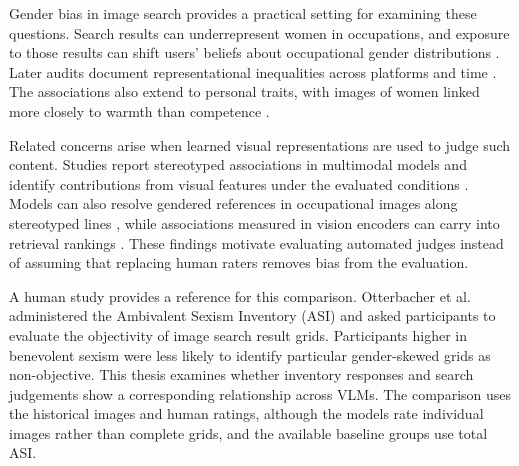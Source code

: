 Gender bias in image search provides a practical setting for examining these
questions. Search results can underrepresent women in occupations, and exposure
to those results can shift users' beliefs about occupational gender distributions
\cite{kay2015unequal}. Later audits document representational inequalities
across platforms and time \cite{metaxa2021image}. The associations also extend
to personal traits, with images of women linked more closely to warmth than
competence \cite{otterbacher2017competent}.

Related concerns arise when learned visual representations are used to judge
such content. Studies report stereotyped associations in multimodal models and
identify contributions from visual features under the evaluated conditions
\cite{jiang2024modscan,weng2024images}. Models can also resolve gendered
references in occupational images along stereotyped lines
\cite{hall2023visogender}, while associations measured in vision encoders can
carry into retrieval rankings \cite{ghate2025biases}. These findings motivate
evaluating automated judges instead of assuming that replacing human raters
removes bias from the evaluation.

A human study provides a reference for this comparison. Otterbacher et al.\
\cite{otterbacher2018sigir} administered the Ambivalent Sexism Inventory
(ASI) \cite{glick1996asi} and asked participants to evaluate the objectivity
of image search result grids. Participants higher in benevolent sexism were
less likely to identify particular gender-skewed grids as non-objective.
This thesis examines whether inventory responses and search judgements show
a corresponding relationship across VLMs. The comparison uses the historical
images and human ratings, although the models rate individual images rather
than complete grids, and the available baseline groups use total ASI.

